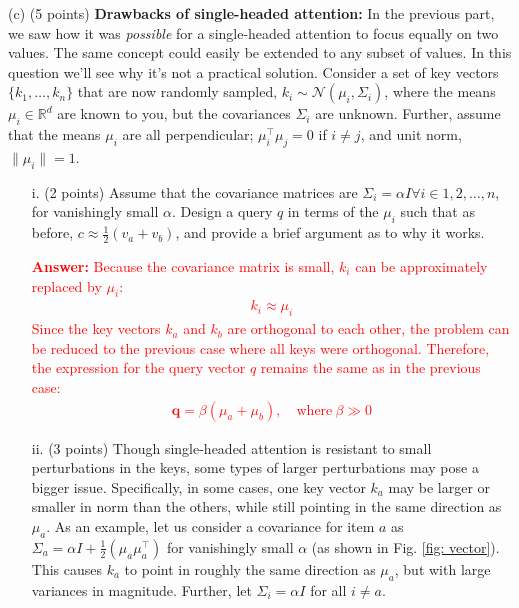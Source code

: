 \documentclass[letterpaper,12pt]{article}
\begin{document}
	\noindent(c) (5 points) \textbf{Drawbacks of single-headed attention:} In the previous part, we saw how it was \textit{possible} for a single-headed attention to focus equally on two values. The same concept could easily be extended to any subset of values. In this question we'll see why it's not a practical solution. Consider a set of key vectors $\{k_1, \ldots , k_n\}$ that are now randomly sampled, $k_i \sim \mathcal{N}(μ_i,\Sigma_i)$, where the means $μ_i \in \mathbb{R}^d$ are known to you, but the covariances $\Sigma_i$ are unknown. Further, assume that the means $μ_i$ are all perpendicular; $\mu^\top_i \mu_j = 0$ if $i \neq j$, and unit norm, $\|\mu_i\| = 1$.
	
	\begin{itemize}
	\item[i.]
		(2 points) Assume that the covariance matrices are $\Sigma_i = \alpha I \forall i \in {1, 2, \ldots , n}$, for vanishingly small $\alpha$. Design a query $q$ in terms of the $\mu_i$ such that as before, $c \approx \frac{1}{2}(v_a +v_b)$, and provide a brief argument as to why it works.
		
		\textcolor{red}{\textbf{Answer:} Because the covariance matrix is small, $k_i$ can be approximately replaced by $\mu_i$:
		\begin{equation*}
			\begin{aligned}
				k_i \approx \mu_i
			\end{aligned}
		\end{equation*}
		Since the key vectors $k_a$ and $k_b$ are orthogonal to each other, the problem can be reduced to the previous case where all keys were orthogonal. Therefore, the expression for the query vector $q$ remains the same as in the previous case: 
		\begin{equation*}
			\begin{aligned}
				\mathbf{q}=\beta(\mu_a+\mu_b), \quad \text{where} \ \beta \gg 0
			\end{aligned}
		\end{equation*}
		}
		
	\item[ii.]
		(3 points) Though single-headed attention is resistant to small perturbations in the keys, some types of larger perturbations may pose a bigger issue. Specifically, in some cases, one key vector $k_a$ may be larger or smaller in norm than the others, while still pointing in the same direction as $\mu_a$. As an example, let us consider a covariance for item $a$ as $\Sigma_a = \alpha I+ \frac{1}{2}(\mu_a\mu^\top_a )$ for vanishingly small $\alpha$ (as shown in Fig. \ref{fig: vector}). This causes $k_a$ to point in roughly the same direction as $\mu_a$, but with large variances in magnitude. Further, let $\Sigma_i = \alpha I$ for all $i \neq a$.
		

\end{itemize}
\end{document}
